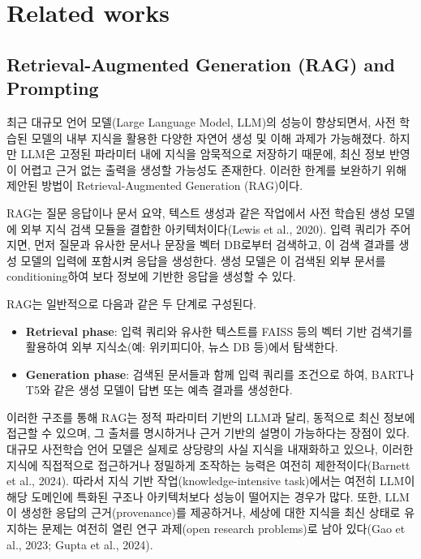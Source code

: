 \documentclass[a4paper,fleqn]{cas-sc}
\begin{document}
\section{Related works}


\subsection{Retrieval-Augmented Generation (RAG) and Prompting}
최근 대규모 언어 모델(Large Language Model, LLM)의 성능이 향상되면서, 사전 학습된 모델의 내부 지식을 활용한 다양한 자연어 생성 및 이해 과제가 가능해졌다. 하지만 LLM은 고정된 파라미터 내에 지식을 암묵적으로 저장하기 때문에, 최신 정보 반영이 어렵고 근거 없는 출력을 생성할 가능성도 존재한다. 이러한 한계를 보완하기 위해 제안된 방법이 Retrieval-Augmented Generation (RAG)이다.

RAG는 질문 응답이나 문서 요약, 텍스트 생성과 같은 작업에서 사전 학습된 생성 모델에 외부 지식 검색 모듈을 결합한 아키텍처이다(Lewis et al., 2020). 입력 쿼리가 주어지면, 먼저 질문과 유사한 문서나 문장을 벡터 DB로부터 검색하고, 이 검색 결과를 생성 모델의 입력에 포함시켜 응답을 생성한다. 생성 모델은 이 검색된 외부 문서를 conditioning하여 보다 정보에 기반한 응답을 생성할 수 있다.

RAG는 일반적으로 다음과 같은 두 단계로 구성된다.
\begin{itemize}
    \item{\textbf{Retrieval phase}:
    입력 쿼리와 유사한 텍스트를 FAISS 등의 벡터 기반 검색기를 활용하여 외부 지식소(예: 위키피디아, 뉴스 DB 등)에서 탐색한다.}
    \item{\textbf{Generation phase}:
    검색된 문서들과 함께 입력 쿼리를 조건으로 하여, BART나 T5와 같은 생성 모델이 답변 또는 예측 결과를 생성한다.}
\end{itemize}
이러한 구조를 통해 RAG는 정적 파라미터 기반의 LLM과 달리, 동적으로 최신 정보에 접근할 수 있으며, 그 출처를 명시하거나 근거 기반의 설명이 가능하다는 장점이 있다.
대규모 사전학습 언어 모델은 실제로 상당량의 사실 지식을 내재화하고 있으나, 이러한 지식에 직접적으로 접근하거나 정밀하게 조작하는 능력은 여전히 제한적이다(Barnett et al., 2024). 따라서 지식 기반 작업(knowledge-intensive task)에서는 여전히 LLM이 해당 도메인에 특화된 구조나 아키텍처보다 성능이 떨어지는 경우가 많다. 또한, LLM이 생성한 응답의 근거(provenance)를 제공하거나, 세상에 대한 지식을 최신 상태로 유지하는 문제는 여전히 열린 연구 과제(open research problems)로 남아 있다(Gao et al., 2023; Gupta et al., 2024).
\end{document}
